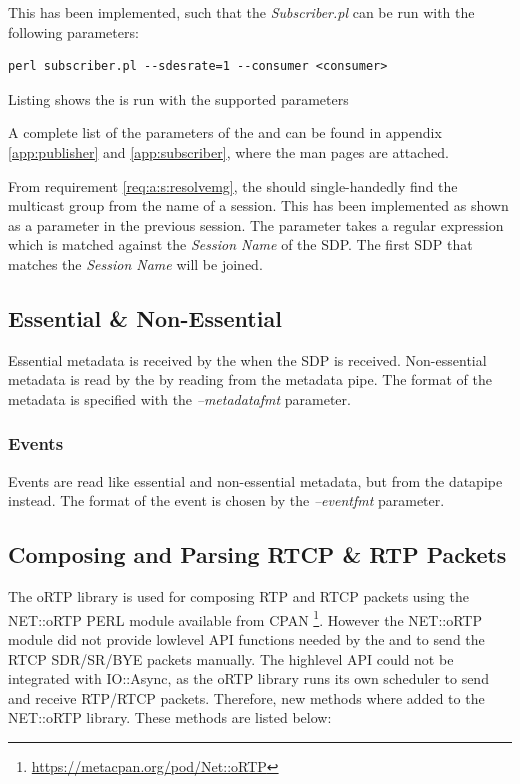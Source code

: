 This has been implemented, such that the \textit{Subscriber.pl} can be run with the following parameters:
\begin{listing}[h] 
\begin{verbatim}
perl subscriber.pl --sdesrate=1 --consumer <consumer>
\end{verbatim}
\caption{Listing shows the \sub{} is run with the supported parameters}
\label{lst:implementation:parametersubscriber}
\end{listing}


\noindent{}A complete list of the parameters of the \pub{} and \sub{} can be found in appendix \ref{app:publisher} and \ref{app:subscriber}, where the man pages are attached.

From requirement \ref{req:a:s:resolvemg}, the \sub{} should single-handedly find the multicast group from the name of a session. This has been implemented as shown as a parameter in the previous session. The parameter takes a regular expression which is matched against the \textit{Session Name} of the SDP. The first SDP that matches the \textit{Session Name} will be joined.


\subsection{Essential \& Non-Essential} \label{sec:implementation:esssub}
Essential metadata is received by the \sub{} when the SDP is received. Non-essential metadata is read by the  \con{} by reading from the metadata pipe. The format of the metadata is specified with the \textit{--metadatafmt} parameter.

\subsubsection{Events} \label{sec:implementation:eventssub}
Events are read like essential and non-essential metadata, but from the datapipe instead. The format of the event is chosen by the \textit{--eventfmt} parameter.


\subsection{Composing and Parsing RTCP \& RTP Packets}
The oRTP library is used for composing RTP and RTCP packets using the NET::oRTP PERL module available from CPAN \footnote{\url{https://metacpan.org/pod/Net::oRTP}}. However the NET::oRTP module did not provide lowlevel API functions needed by the \pub{} and \sub{} to send the RTCP SDR/SR/BYE packets manually. The highlevel API could not be integrated with IO::Async, as the oRTP library runs its own scheduler to send and receive RTP/RTCP packets. Therefore, new methods where added to the NET::oRTP library. These methods are listed below:

